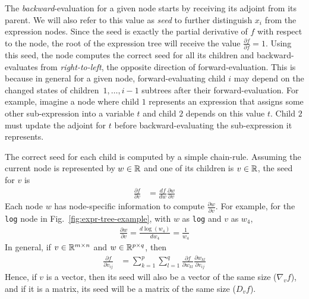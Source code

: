 The \emph{backward}-evaluation for a given node starts by receiving its adjoint from its parent.
We will also refer to this value as \emph{seed} to further distinguish $x_i$ from the expression nodes.
Since the seed is exactly the partial derivative of $f$ with respect to the node,
the root of the expression tree will receive the value $ \frac{\partial f}{\partial f} = 1$.
Using this seed, the node computes the correct seed for all its children and 
backward-evaluates from \emph{right-to-left}, the opposite direction of forward-evaluation.
This is because in general for a given node, forward-evaluating child $i$ may depend
on the changed states of children~$1,\ldots,i-1$ subtrees after their forward-evaluation.
For example, imagine a node where child $1$ represents an expression that 
assigns some other sub-expression into a variable $t$ and child $2$ depends on this value $t$.
Child $ 2$ must update the adjoint for $t$ before backward-evaluating the sub-expression it represents.

The correct seed for each child is computed by a simple chain-rule.
Assuming the current node is represented by $w \in \mathbb{R}$ and one of its children is $v \in \mathbb{R}$,
the seed for $v$ is
\begin{align}
    \frac{\partial f}{\partial v} &=
    \frac{df}{dw} \frac{\partial w}{\partial v} \label{eq:next-seed}
\end{align}
Each node $w$ has node-specific information to compute $\frac{\partial w}{\partial v}$.
For example, for the \verb|log| node in Fig.~\ref{fig:expr-tree-example},
with $w$ as \verb|log| and $v$ as $w_4$,
\begin{align*}
    \frac{\partial w}{\partial v} = \frac{d\log(w_4)}{dw_4} = \frac{1}{w_4}
\end{align*}
In general, if $v \in \mathbb{R}^{m \times n}$ and $w \in \mathbb{R}^{p \times q}$, then
\begin{align*}
    \frac{\partial f}{\partial v_{ij}} &=
        \sum\limits_{k=1}^p \sum\limits_{l=1}^q 
        \frac{\partial f}{\partial w_{kl}} \frac{\partial w_{kl}}{\partial v_{ij}}
\end{align*}
Hence, if $v$ is a vector, then its seed will also be a vector of the same size ($\nabla_v f$),
and if it is a matrix, its seed will be a matrix of the same size ($D_v f$).

